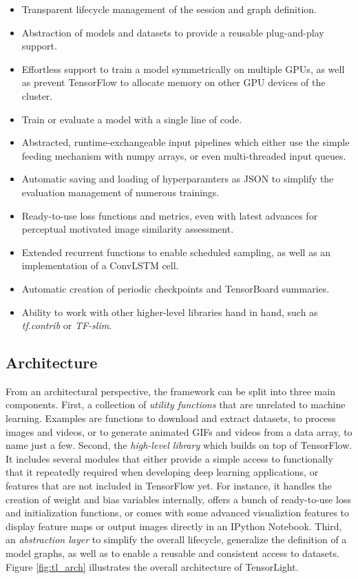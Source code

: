 \begin{itemize}
\item Transparent lifecycle management of the session and graph definition.
\item Abstraction of models and datasets to provide a reusable plug-and-play support.
\item Effortless support to train a model symmetrically on multiple GPUs, as well as prevent TensorFlow to allocate memory on other GPU devices of the cluster.
\item Train or evaluate a model with a single line of code.
\item Abstracted, runtime-exchangeable input pipelines which either use the simple feeding mechanism with numpy arrays, or even multi-threaded input queues.
\item Automatic saving and loading of hyperparamters as JSON to simplify the evaluation management of numerous trainings.
\item Ready-to-use loss functions and metrics, even with latest advances for perceptual motivated image similarity assessment.
\item Extended recurrent functions to enable scheduled sampling, as well as an implementation of a ConvLSTM cell.
\item Automatic creation of periodic checkpoints and TensorBoard summaries.
\item Ability to work with other higher-level libraries hand in hand, such as \textit{tf.contrib} or \textit{TF-slim}.
\end{itemize}


\subsection{Architecture}

From an architectural perspective, the framework can be split into three main components. First, a collection of \textit{utility functions} that are unrelated to machine learning. Examples are functions to download and extract datasets, to process images and videos, or to generate animated GIFs and videos from a data array, to name just a few. Second, the \textit{high-level library} which builds on top of TensorFlow. It includes several modules that either provide a simple access to functionally that it repeatedly required when developing deep learning applications, or features that are not included in TensorFlow yet. For instance, it handles the creation of weight and bias variables internally, offers a bunch of ready-to-use loss and initialization functions, or comes with some advanced visualiztion features to display feature maps or output images directly in an IPython Notebook. Third, an \textit{abstraction layer} to simplify the overall lifecycle, generalize the definition of a model graphs, as well as to enable a reusable and consistent access to datasets. Figure \ref{fig:tl_arch} illustrates the overall architecture of TensorLight.

